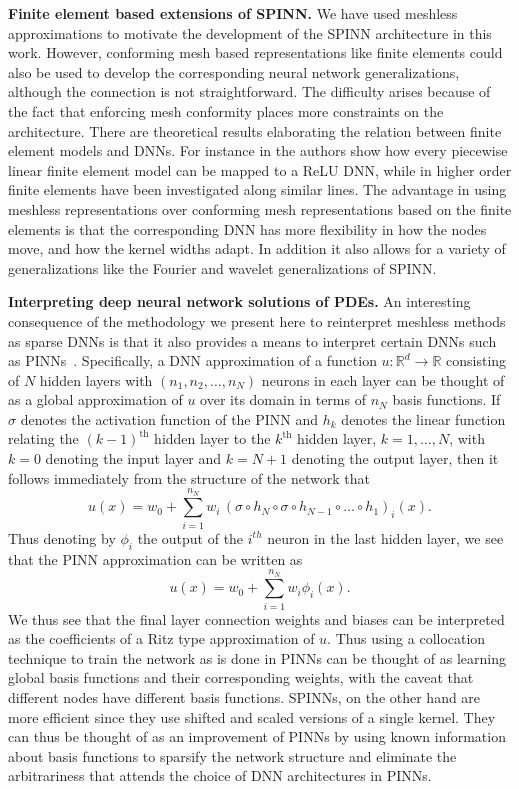 \documentclass[12pt]{article}
\begin{document}
\textbf{Finite element based extensions of SPINN.} We have used meshless approximations to motivate the development of the SPINN architecture in this work. However, conforming mesh based representations like finite elements could also be used to develop the corresponding neural network generalizations, although the connection is not straightforward. The difficulty arises because of the fact that enforcing mesh conformity places more constraints on the architecture. There are theoretical results elaborating the relation between finite element models and DNNs. For instance in \cite{HLXZ2020} the authors show how every piecewise linear finite element model can be mapped to a ReLU DNN, while in \cite{OPS19} higher order finite elements have been investigated along similar lines.  The advantage in using meshless representations over conforming mesh representations based on the finite elements is that the corresponding DNN has more flexibility in how the nodes move, and how the kernel widths adapt. In addition it also allows for a variety of generalizations like the Fourier and wavelet generalizations of SPINN.

\textbf{Interpreting deep neural network solutions of PDEs.} An interesting consequence of the methodology we present here to reinterpret meshless methods as sparse DNNs is that it also provides a means to interpret certain DNNs such as PINNs~\cite{RPK2019}. Specifically, a DNN approximation of a function $u:\mathbb{R}^d \to \mathbb{R}$ consisting of $N$ hidden layers with $(n_1, n_2, \ldots, n_N)$ neurons in each layer can be thought of as a global approximation of $u$ over its domain in terms of $n_N$ basis functions. If $\sigma$ denotes the activation function of the PINN and $h_k$ denotes the linear function relating the $(k-1)^{\text{th}}$ hidden layer to the $k^{\text{th}}$ hidden layer, $k = 1, \ldots, N$, with $k = 0$ denoting the input layer and $k = N + 1$ denoting the output layer, then it follows immediately from the structure of the network that
\begin{displaymath}
u(x) = w_0 + \sum_{i=1}^{n_N} w_i \,(\sigma \circ h_{N} \circ \sigma \circ h_{N-1} \circ \ldots \circ h_1)_i(x).
\end{displaymath}
Thus denoting by $\phi_i$ the output of the $i^{th}$ neuron in the last hidden layer, we see that the PINN approximation can be written as
\begin{displaymath}
u(x) = w_0 + \sum_{i=1}^{n_N} w_i \phi_i(x).
\end{displaymath}
We thus see that the final layer connection weights and biases can be interpreted as the coefficients of a Ritz type approximation of $u$. Thus using a collocation technique to train the network as is done in PINNs can be thought of as learning global basis functions and their corresponding weights, with the caveat that different nodes have different basis functions. SPINNs, on the other hand are more efficient since they use shifted and scaled versions of a single kernel. They can thus be thought of as an improvement of PINNs by using known information about basis functions to sparsify the network structure and eliminate the arbitrariness that attends the choice of DNN architectures in PINNs.  
\end{document}
